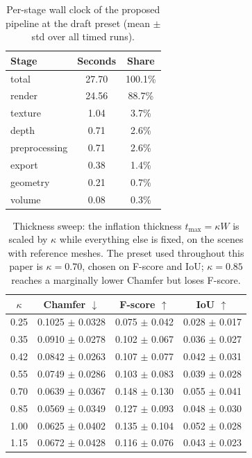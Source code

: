 \begin{table}[t]
\centering
\caption{Per-stage wall clock of the proposed pipeline at the draft preset (mean $\pm$ std over all timed runs).}
\label{tab:stages}
\begin{tabular}{lcc}
\toprule
Stage & Seconds & Share \\
\midrule
total & 27.70 & 100.1\% \\
render & 24.56 & 88.7\% \\
texture & 1.04 & 3.7\% \\
depth & 0.71 & 2.6\% \\
preprocessing & 0.71 & 2.6\% \\
export & 0.38 & 1.4\% \\
geometry & 0.21 & 0.7\% \\
volume & 0.08 & 0.3\% \\
\bottomrule
\end{tabular}
\end{table}

\begin{table}[t]
\centering
\caption{Thickness sweep: the inflation thickness $t_{\max}=\kappa W$ is scaled by $\kappa$ while everything else is fixed, on the scenes with reference meshes. The preset used throughout this paper is $\kappa=0.70$, chosen on F-score and IoU; $\kappa=0.85$ reaches a marginally lower Chamfer but loses F-score.}
\label{tab:sweep}
\begin{tabular}{cccc}
\toprule
$\kappa$ & Chamfer $\downarrow$ & F-score $\uparrow$ & IoU $\uparrow$ \\
\midrule
0.25 & 0.1025 $\pm$ 0.0328 & 0.075 $\pm$ 0.042 & 0.028 $\pm$ 0.017 \\
0.35 & 0.0910 $\pm$ 0.0278 & 0.102 $\pm$ 0.067 & 0.036 $\pm$ 0.027 \\
0.42 & 0.0842 $\pm$ 0.0263 & 0.107 $\pm$ 0.077 & 0.042 $\pm$ 0.031 \\
0.55 & 0.0749 $\pm$ 0.0286 & 0.103 $\pm$ 0.083 & 0.039 $\pm$ 0.028 \\
0.70 & 0.0639 $\pm$ 0.0367 & 0.148 $\pm$ 0.130 & 0.055 $\pm$ 0.041 \\
0.85 & 0.0569 $\pm$ 0.0349 & 0.127 $\pm$ 0.093 & 0.048 $\pm$ 0.030 \\
1.00 & 0.0625 $\pm$ 0.0402 & 0.135 $\pm$ 0.104 & 0.052 $\pm$ 0.028 \\
1.15 & 0.0672 $\pm$ 0.0428 & 0.116 $\pm$ 0.076 & 0.043 $\pm$ 0.023 \\
\bottomrule
\end{tabular}
\end{table}

